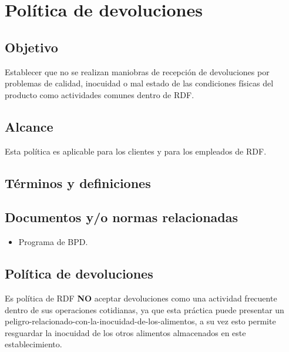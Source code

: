 \thispagestyle{formato-PI}
\renewcommand{\MayorVer}{2}
\renewcommand{\MenorVer}{0}
\renewcommand{\FechaPub}{2023--01}
\renewcommand{\TipoID}{POL}
\renewcommand{\Titulo}{Política de devoluciones}

\section{\Titulo}
\renewcommand{\Codigo}{\Prog--\thesection--\TipoID}

\subsection{Objetivo}

Establecer que no se realizan maniobras de recepción de devoluciones por problemas de calidad, inocuidad o mal estado de las condiciones físicas del producto como actividades comunes dentro de \gls{RDF}.

\subsection{Alcance}

Esta política es aplicable para los clientes y para los empleados de \gls{RDF}.

\subsection{Términos y definiciones}

\begin{description}
\end{description}

\subsection{Documentos y/o normas relacionadas}
\begin{itemize}
	\item Programa de \gls{BPD}.
\end{itemize}

\subsection{Política de devoluciones}
Es política de \gls{RDF} \textbf{NO} aceptar devoluciones como una actividad frecuente dentro de sus operaciones cotidianas, ya que esta práctica puede presentar un \gls{peligro-relacionado-con-la-inocuidad-de-los-alimentos}, a su vez esto permite resguardar la inocuidad de los otros \glspl{alimento} almacenados en este establecimiento.


